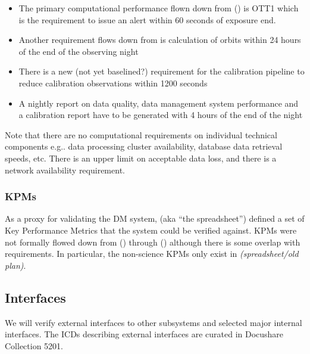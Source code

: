 \begin{itemize}

\item The primary computational performance flown down from  (\LSR) is OTT1 which is the requirement to issue an alert within 60 seconds of exposure end.

\item Another requirement flows down from  is calculation of orbits within 24 hours of the end of the observing night

\item There is a new (not yet baselined?) requirement for the calibration pipeline to reduce calibration observations within 1200 seconds

\item A nightly report on data quality, data management system performance and a calibration report have to be generated with 4 hours of the end of the night

\end{itemize}

Note that there are no computational requirements on individual technical components e.g.. data processing cluster availability, database data retrieval speeds, etc. There is an upper limit on acceptable data loss, and there is a network availability requirement.

\subsubsection{KPMs}

As a proxy for validating the DM system,  (aka “the spreadsheet”) defined a set of Key Performance Metrics that the system could be verified against. KPMs were not formally flowed down from  (\LSR) through  (\OSS) although there is some overlap with  requirements. In particular, the non-science KPMs only exist in  \textit{(spreadsheet/old plan)}.

\subsection{Interfaces}

We will verify external interfaces to other subsystems and selected major internal interfaces. The ICDs describing external interfaces are curated in Docushare Collection 5201.


